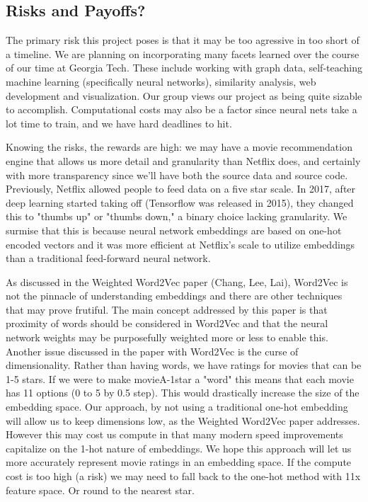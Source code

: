 \subsection{Risks and Payoffs?}

The primary risk this project poses is that it may be too agressive in too short of a timeline. We are planning on incorporating many facets learned over the course of our time at Georgia Tech. These include working with graph data, self-teaching machine learning (specifically neural networks), similarity analysis, web development and visualization. Our group views our project as being quite sizable to accomplish. Computational costs may also be a factor since neural nets take a lot time to train, and we have hard deadlines to hit.

Knowing the risks, the rewards are high: we may have a movie recommendation engine that allows us more detail and granularity than Netflix does, and certainly with more transparency since we'll have both the source data and source code. Previously, Netflix allowed people to feed data on a five star scale. In 2017, after deep learning started taking off (Tensorflow was released in 2015), they changed this to "thumbs up" or "thumbs down," a binary choice lacking granularity. We surmise that this is because neural network embeddings are based on one-hot encoded vectors and it was more efficient at Netflix's scale to utilize embeddings than a traditional feed-forward neural network.

As discussed in the Weighted Word2Vec paper (Chang, Lee, Lai), Word2Vec is not the pinnacle of understanding embeddings and there are other techniques that may prove frutiful. The main concept addressed by this paper is that proximity of words should be considered in Word2Vec and that the neural network weights may be purposefully weighted more or less to enable this. Another issue discussed in the paper with Word2Vec is the curse of dimensionality. Rather than having words, we have ratings for movies that can be 1-5 stars. If we were to make movieA-1star a "word" this means that each movie has 11 options (0 to 5 by 0.5 step). This would drastically increase the size of the embedding space. Our approach, by not using a traditional one-hot embedding will allow us to keep dimensions low, as the Weighted Word2Vec paper addresses. However this may cost us compute in that many modern speed improvements capitalize on the 1-hot nature of embeddings. We hope this approach will let us more accurately represent movie ratings in an embedding space. If the compute cost is too high (a risk) we may need to fall back to the one-hot method with 11x feature space. Or round to the nearest star.

